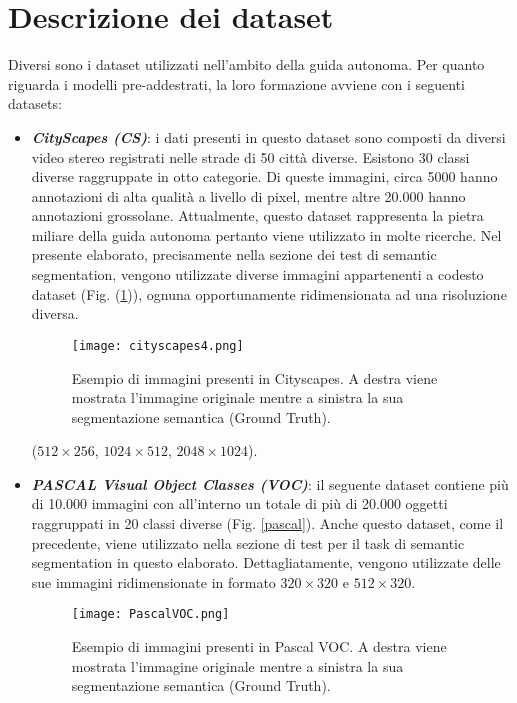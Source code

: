 \section{Descrizione dei dataset}\label{datasets_description}
Diversi sono i dataset utilizzati nell'ambito della guida autonoma.
Per quanto riguarda i modelli pre-addestrati, la loro formazione avviene con i seguenti datasets:
\begin{itemize}
    \item {\bfseries{\emph{CityScapes (CS)}}}\cite{Cityscapes}: i dati presenti in questo dataset sono composti da 
    diversi video stereo registrati nelle strade di 50 città diverse. Esistono 
    30 classi diverse raggruppate in otto categorie. Di queste immagini, 
    circa 5000 hanno annotazioni di alta qualità a livello di pixel, mentre altre 
    20.000 hanno annotazioni grossolane. Attualmente, questo dataset 
    rappresenta la pietra miliare della guida autonoma pertanto viene 
    utilizzato in molte ricerche. Nel presente elaborato, precisamente 
    nella sezione dei test di semantic segmentation, vengono utilizzate diverse 
    immagini appartenenti a codesto dataset (Fig. (\ref{cityscapes})), ognuna opportunamente ridimensionata ad una risoluzione diversa.
    \begin{figure}
        \centering
        \texttt{[image: cityscapes4.png]}
        \centering
        \caption{Esempio di immagini presenti in Cityscapes. A destra viene mostrata l'immagine originale mentre a sinistra la sua segmentazione semantica (Ground Truth).}
        \label{cityscapes}
    \end{figure} 
    ($512\times 256$, $1024\times 512$, $2048\times 1024$).
    \item {\bfseries{\emph{PASCAL Visual Object Classes (VOC)}}}\cite{VOC}: il seguente dataset 
    contiene più di 10.000 immagini con all'interno un totale di più di 20.000 
    oggetti raggruppati in 20 classi diverse (Fig. \ref{pascal}). Anche questo dataset, come 
    il precedente, viene utilizzato nella sezione di test per il task di 
    semantic segmentation in questo elaborato. Dettagliatamente, vengono 
    utilizzate delle sue immagini ridimensionate in formato $320\times 320$ e $512\times 320$.
    \begin{figure}
        \centering
        \texttt{[image: PascalVOC.png]}
        \centering
        \caption{Esempio di immagini presenti in Pascal VOC. A destra viene mostrata l'immagine originale mentre a sinistra la sua segmentazione semantica (Ground Truth).}

\end{figure}
\end{itemize}
